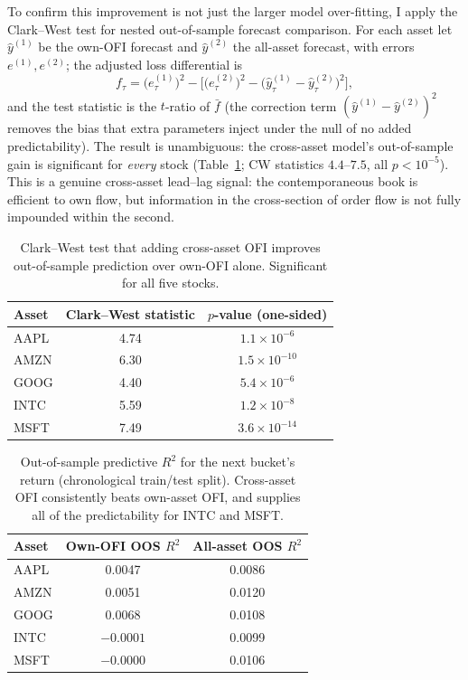 \documentclass[11pt]{article}
\begin{document}
To confirm this improvement is not just the larger model over-fitting, I apply the
Clark--West test for nested out-of-sample forecast comparison. For each asset let
$\hat y^{(1)}$ be the own-OFI forecast and $\hat y^{(2)}$ the all-asset forecast,
with errors $e^{(1)}, e^{(2)}$; the adjusted loss differential is
\begin{equation}
f_\tau = \big(e^{(1)}_\tau\big)^2 - \Big[\big(e^{(2)}_\tau\big)^2 - \big(\hat y^{(1)}_\tau - \hat y^{(2)}_\tau\big)^2\Big],
\end{equation}
and the test statistic is the $t$-ratio of $\bar f$ (the correction term
$(\hat y^{(1)}-\hat y^{(2)})^2$ removes the bias that extra parameters inject under
the null of no added predictability). The result is unambiguous: the cross-asset
model's out-of-sample gain is significant for \emph{every} stock
(Table~\ref{tab:cw}; CW statistics $4.4$--$7.5$, all $p < 10^{-5}$). This is a
genuine cross-asset lead--lag signal: the contemporaneous book is efficient to own
flow, but information in the cross-section of order flow is not fully impounded
within the second.

\begin{table}[h]
\centering
\begin{tabular}{lcc}
\toprule
Asset & Clark--West statistic & $p$-value (one-sided) \\
\midrule
AAPL & 4.74 & $1.1\times10^{-6}$ \\
AMZN & 6.30 & $1.5\times10^{-10}$ \\
GOOG & 4.40 & $5.4\times10^{-6}$ \\
INTC & 5.59 & $1.2\times10^{-8}$ \\
MSFT & 7.49 & $3.6\times10^{-14}$ \\
\bottomrule
\end{tabular}
\caption{Clark--West test that adding cross-asset OFI improves out-of-sample
prediction over own-OFI alone. Significant for all five stocks.}
\label{tab:cw}
\end{table}

\begin{table}[h]
\centering
\begin{tabular}{lcc}
\toprule
Asset & Own-OFI OOS $R^2$ & All-asset OOS $R^2$ \\
\midrule
AAPL & 0.0047 & 0.0086 \\
AMZN & 0.0051 & 0.0120 \\
GOOG & 0.0068 & 0.0108 \\
INTC & $-0.0001$ & 0.0099 \\
MSFT & $-0.0000$ & 0.0106 \\
\bottomrule
\end{tabular}
\caption{Out-of-sample predictive $R^2$ for the next bucket's return (chronological
train/test split). Cross-asset OFI consistently beats own-asset OFI, and supplies
all of the predictability for INTC and MSFT.}
\label{tab:xipred}
\end{table}
\end{document}

